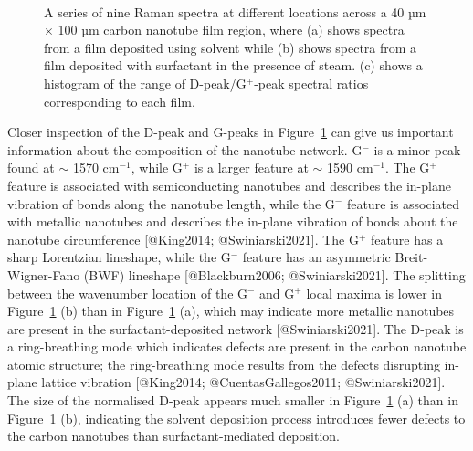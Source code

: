 \documentclass[
  letterpaper,
  DIV=11,
  numbers=noendperiod]{scrartcl}
\begin{document}
\begin{figure}
\begin{minipage}[t]{0.72\linewidth}
{{}

}

\end{minipage}%
%
\begin{minipage}[t]{0.14\linewidth}

{\centering 

~

}

\end{minipage}%

\caption{\label{fig-pristine-raman}A series of nine Raman spectra at
different locations across a 40 µm \(\times\) 100 µm carbon nanotube
film region, where (a) shows spectra from a film deposited using solvent
while (b) shows spectra from a film deposited with surfactant in the
presence of steam. (c) shows a histogram of the range of
D-peak/G\(^+\)-peak spectral ratios corresponding to each film.}

\end{figure}

Closer inspection of the D-peak and G-peaks in
Figure~\ref{fig-pristine-raman} can give us important information about
the composition of the nanotube network. G\(^-\) is a minor peak found
at \(\sim\) 1570 cm\(^{-1}\), while G\(^+\) is a larger feature at
\(\sim\) 1590 cm\(^{-1}\). The G\(^+\) feature is associated with
semiconducting nanotubes and describes the in-plane vibration of bonds
along the nanotube length, while the G\(^-\) feature is associated with
metallic nanotubes and describes the in-plane vibration of bonds about
the nanotube circumference {[}@King2014; @Swiniarski2021{]}. The G\(^+\)
feature has a sharp Lorentzian lineshape, while the G\(^-\) feature has
an asymmetric Breit-Wigner-Fano (BWF) lineshape {[}@Blackburn2006;
@Swiniarski2021{]}. The splitting between the wavenumber location of the
G\(^-\) and G\(^+\) local maxima is lower in
Figure~\ref{fig-pristine-raman} (b) than in
Figure~\ref{fig-pristine-raman} (a), which may indicate more metallic
nanotubes are present in the surfactant-deposited network
{[}@Swiniarski2021{]}. The D-peak is a ring-breathing mode which
indicates defects are present in the carbon nanotube atomic structure;
the ring-breathing mode results from the defects disrupting in-plane
lattice vibration {[}@King2014; @CuentasGallegos2011;
@Swiniarski2021{]}. The size of the normalised D-peak appears much
smaller in Figure~\ref{fig-pristine-raman} (a) than in
Figure~\ref{fig-pristine-raman} (b), indicating the solvent deposition
process introduces fewer defects to the carbon nanotubes than
surfactant-mediated deposition.
\end{document}
